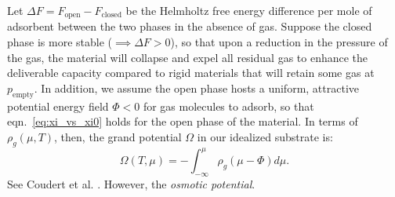 \documentclass[twoside,twocolumn,9pt]{article}
\newcommand\V{\Phi}
\newcommand\pempty{\ensuremath{p_{\text{empty}}}}
\begin{document}
Let $\Delta F=F_{\text{open}}-F_{\text{closed}}$ be the Helmholtz free energy difference per mole of adsorbent between the two phases in the absence of gas.
Suppose the closed phase is more stable ($\implies \Delta F >0$), so that upon a reduction in the pressure of the gas, the material will collapse and expel all residual gas to enhance the deliverable capacity compared to rigid materials that will retain some gas at $\pempty$. 
In addition, we assume the open phase hosts a uniform, attractive potential energy field $\V<0$ for gas molecules to adsorb, so that eqn.~\ref{eq:xi_vs_xi0} holds for the open phase of the material.
In terms of $\rho_g(\mu, T)$, then, the grand potential $\Omega$ in our idealized substrate is:
\begin{equation}
    \Omega(T, \mu) = - \int_{-\infty}^\mu \rho_g(\mu-\V)d\mu.
\end{equation}
See Coudert et al. \cite{coudert2008thermodynamics}.
However, the \emph{osmotic potential}.
\end{document}
